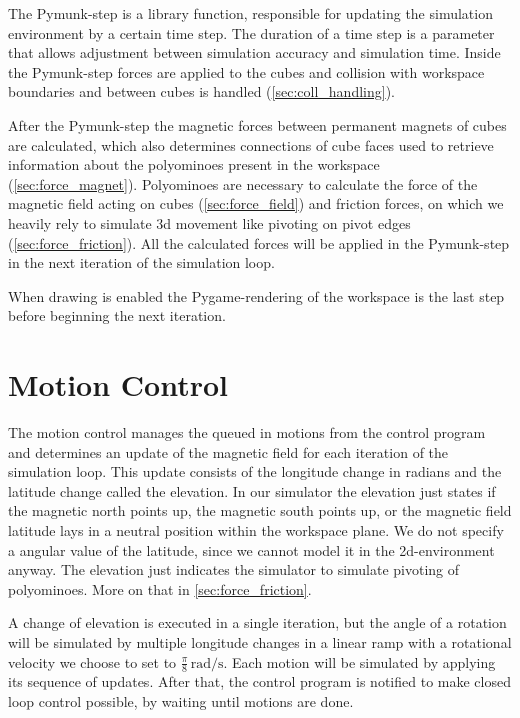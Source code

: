 The Pymunk-step is a library function, responsible for updating the simulation environment by a certain time step.
The duration of a time step is a parameter that allows adjustment between simulation accuracy and simulation time. 
Inside the Pymunk-step forces are applied to the cubes and collision with workspace boundaries and between cubes is handled (\autoref{sec:coll_handling}).

After the Pymunk-step the magnetic forces between permanent magnets of cubes are calculated, which also determines connections of cube faces used to retrieve information about the polyominoes present in the workspace (\autoref{sec:force_magnet}).
Polyominoes are necessary to calculate the force of the magnetic field acting on cubes (\autoref{sec:force_field}) and friction forces, on which we heavily rely to simulate 3d movement like pivoting on pivot edges (\autoref{sec:force_friction}).
All the calculated forces will be applied in the Pymunk-step in the next iteration of the simulation loop.

When drawing is enabled the Pygame-rendering of the workspace is the last step before beginning the next iteration.


\section{Motion Control}
\label{sec:motion_control}

The motion control manages the queued in motions from the control program and determines an update of the magnetic field for each iteration of the simulation loop.
This update consists of the longitude change in radians and the latitude change called the elevation.
In our simulator the elevation just states if the magnetic north points up, the magnetic south points up, or the magnetic field latitude lays in a neutral position within the workspace plane.
We do not specify a angular value of the latitude, since we cannot model it in the 2d-environment anyway.
The elevation just indicates the simulator to simulate pivoting of polyominoes.
More on that in \autoref{sec:force_friction}.

A change of elevation is executed in a single iteration, but the angle of a rotation will be simulated by multiple longitude changes in a linear ramp with a rotational velocity we choose to set to $\frac{\pi}{8} \, \text{rad}/\text{s}$.
Each motion will be simulated by applying its sequence of updates.
After that, the control program is notified to make closed loop control possible, by waiting until motions are done.

